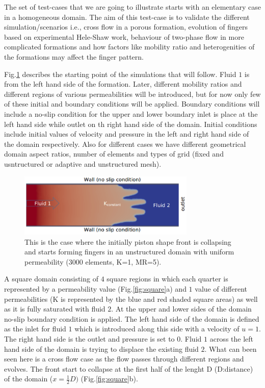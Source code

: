 \documentclass[preprint,authoryear,12pt]{elsarticle}
\begin{document}
The set of test-cases that we are going to illustrate starts with an elementary case in a homogeneous domain. The aim of this test-case is to validate the different simulation/scenarios i.e., cross flow in a porous formation, evolution of fingers based on experimental Hele-Shaw work, behaviour of two-phase flow in more complicated formations and how factors like mobility ratio and heterogenities of the formations may affect the finger pattern. 

Fig.\ref{fig:simple_case} describes the starting point of the simulations that will follow. Fluid $1$ is from the left hand side of the formation. Later, different mobility ratios and different regions of various permeabilities will be introduced, but for now only few of these initial and boundary conditions will be applied. Boundary conditions will include a no-slip condition for the upper and lower boundary inlet is place at the left hand side while outlet on th right hand side of the domain. Initial conditions include initial values of velocity and pressure in the left and right hand side of the domain respectively. Also for different cases we have different geometrical domain aspect ratios, number of elements and types of grid (fixed and usntructured or adaptive and unstructured mesh). 

\begin{figure}[h]
\begin{center}
\includegraphics[width=0.75\textwidth]{./Pics/phase_vol_frac_uni_perm_1.pdf}
\caption{This is the case where the initially piston shape front is collapsing and starts forming fingers in an unstructured domain with uniform permeability (3000 elements, K=1, MR=5).}
\label{fig:simple_case}
\end{center}
\end{figure}

\noindent A square domain consisting of $4$ square regions in which each quarter is represented by a permeability value (Fig.\ref{fig:square}a) and $1$ value of different permeabilities (K is represented by the blue and red shaded square areas) as well as it is fully saturated with fluid $2$. At the upper and lower sides of the domain no-slip boundary condition is applied. The left hand side of the domain is defined as the inlet for fluid $1$ which is introduced along this side with a velocity of $u=1$. The right hand side is the outlet and pressure is set to $0$. Fluid $1$ across the left hand side of the domain is trying to displace the existing fluid $2$. What can been seen here is a cross flow case as the flow passes through different regions and evolves. The front start to collapse at the first half of the lenght D (D:distance) of the domain ($x= \frac{1}{2} D)$ (Fig.\ref{fig:square}b).
\end{document}
